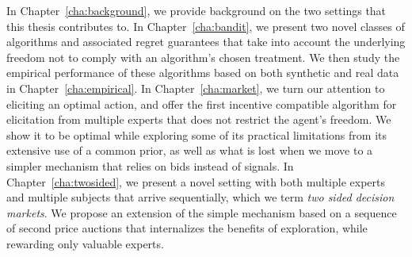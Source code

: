 In Chapter~\ref{cha:background}, we provide background on the two settings that this thesis contributes to. In Chapter~\ref{cha:bandit}, we present two novel classes of algorithms and associated regret guarantees that take into account the underlying freedom not to comply with an algorithm's chosen treatment. We then study the empirical performance  of these algorithms based on both synthetic and real data in Chapter~\ref{cha:empirical}.
In Chapter~\ref{cha:market}, we turn our attention to eliciting an optimal action, and offer the first incentive compatible algorithm for elicitation from multiple experts that does not restrict the agent's freedom. We show it to be optimal while exploring some of its practical limitations from its extensive use of a common prior, as well as what is lost when we move to a simpler mechanism that relies on bids instead of signals.
In Chapter~\ref{cha:twosided}, we present a novel setting with both multiple experts and multiple subjects that arrive sequentially, which we term \emph{two sided decision markets}. We propose an extension of the simple mechanism based on a sequence of second price auctions that internalizes the benefits of exploration, while rewarding only valuable experts.

